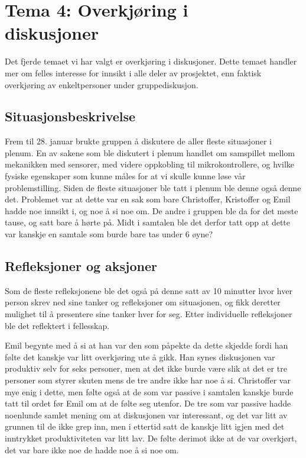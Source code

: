 \chapter{Tema 4: Overkjøring i\\diskusjoner}
Det fjerde temaet vi har valgt er overkjøring i diskusjoner.
Dette temaet handler mer om felles interesse for innsikt i alle deler av
prosjektet, enn faktisk overkjøring av enkeltpersoner under gruppediskusjon.

\section {Situasjonsbeskrivelse}
Frem til 28. januar brukte gruppen å diskutere de aller fleste situasjoner i plenum. En av sakene som ble diskutert i plenum handlet om samspillet mellom mekanikken med sensorer, med videre oppkobling til mikrokontrollere, og hvilke fysiske egenskaper som kunne måles for at vi skulle kunne løse vår problemstilling. Siden de fleste situasjoner ble tatt i plenum ble denne også denne det. Problemet var at dette var en sak som bare Christoffer, Kristoffer og Emil hadde noe innsikt i, og noe å si noe om. De andre i gruppen ble da for det meste tause, og satt bare å hørte på. Midt i samtalen ble det derfor tatt opp at dette var kanskje en samtale som burde bare tas under 6 øyne?

\section{Refleksjoner og aksjoner}
Som de fleste refleksjonene ble det også på denne satt av 10 minutter hvor hver person skrev ned sine tanker og refleksjoner om situasjonen, og fikk deretter mulighet til å presentere sine tanker hver for seg. Etter individuelle refleksjoner ble det reflektert i fellesskap.

Emil begynte med å si at han var den som påpekte da dette skjedde fordi han følte det kanskje var litt overkjøring ute å gikk. Han synes diskusjonen var produktiv selv for seks personer, men at det ikke burde være slik at det er tre personer som styrer skuten mens de tre andre ikke har noe å si. Christoffer var mye enig i dette, men følte også at de som var passive i samtalen kanskje burde tatt til ordet før Emil om at de følte seg utenfor. De tre som var passive hadde noenlunde samlet mening om at diskusjonen var interessant, og det var litt av grunnen til de ikke grep inn, men i ettertid satt de kanskje litt igjen med det inntrykket produktiviteten var litt lav. De følte derimot ikke at de var overkjørt, det var bare ikke noe de hadde noe å si noe om.

